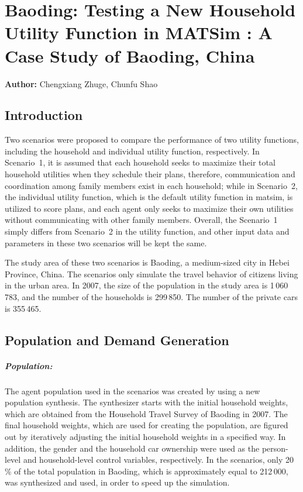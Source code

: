 \chapter{Baoding: Testing a New Household Utility Function in MATSim : A Case Study of Baoding, China}
\label{ch:baoding}
\hfill \textbf{Author:} Chengxiang Zhuge, Chunfu Shao


\section{Introduction}
Two scenarios were proposed to compare the performance of two utility functions, including the household and individual utility function, respectively. 
In Scenario~1, it is assumed that each household seeks to maximize their total household utilities when they schedule their plans, therefore, communication and coordination among family members exist in each household; while in Scenario~2, the individual utility function, which is the default utility function in \gls{matsim}, is utilized to score plans, and each agent only seeks to maximize their own utilities without communicating with other family members. 
Overall, the Scenario~1 simply differs from Scenario~2 in the utility function, and other input data and parameters in these two scenarios will be kept the same. 

The study area of these two scenarios is Baoding, a medium-sized city in Hebei Province, China. 
The scenarios only simulate the travel behavior of citizens living in the urban area. 
In 2007, the size of the population in the study area is 1\,060\,783, and the number of the households is 299\,850.  
The number of the private cars is 355\,465. 

\section{Population and Demand Generation}
\paragraph{Population:} The agent population used in the scenarios was created by using a new population synthesis. 
The synthesizer starts with the initial household weights, which are obtained from the Household Travel Survey of Baoding in 2007. 
The final household weights, which are used for creating the population, are figured out by iteratively adjusting the initial household weights in a specified way. 
In addition, the gender and the household car ownership were used as the person-level and household-level control variables, respectively. 
In the scenarios, only 20\,\% of the total population in Baoding, which is approximately equal to 212\,000, was synthesized and used, in order to speed up the simulation. 

